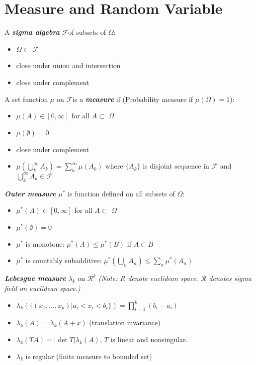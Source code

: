 \documentclass[10pt,twocolumn]{article}
\newenvironment{mydef}[1][Definition]{\begin{trivlist}
\item[\hskip \labelsep {\bfseries #1}]}{\end{trivlist}}
\newcommand{\sigmaField} {$\mathscr{F}$}
\newcommand{\samspace} {$\Omega$}
\newcommand{\real}{ \mathscr{R}}
\newcommand{\bt}[1]{\textbf{\textit{#1}}}
\begin{document}
\section*{Measure and Random Variable}
\begin{mydef}
	A \bt{sigma algebra} \sigmaField of subsets of \samspace:
	\begin{itemize}
		\item \samspace $\in$ \sigmaField
		\item close under union and intersection
		\item close under complement
	\end{itemize}
\end{mydef}

\begin{mydef}
	A set function $\mu$ on \sigmaField is a \bt{measure} if (Probability measure if $\mu (\Omega ) = 1$):
	\begin{itemize}
		\item $\mu (A)\in [0, \infty]$ for all $A \subset$ \samspace
		\item $\mu (\emptyset) = 0$
		\item close under complement
		\item $\mu (\bigcup^{\infty}_k A_k) = \sum^{\infty}_k \mu (A_k)$ where $\{A_k\}$ is disjoint sequence in $\mathscr{F}$ and $\bigcup^{\infty}_kA_k \in \mathscr{F}$
	\end{itemize}
\end{mydef}

\begin{mydef}
	\bt{Outer measure} $\mu^*$ is function defined on all subsets of \samspace:
	\begin{itemize}
		\item $\mu^*(A)\in [0, \infty]$ for all $A \subset$ \samspace
		\item $\mu^*(\emptyset) = 0$
		\item $\mu^*$ is monotone: $\mu^*(A) \leq \mu^*(B)$ if $A \subset B$
		\item $\mu^*$ is countably subadditive: $\mu^*(\bigcup_nA_n) \leq \sum_n \mu^*(A_n)$
	\end{itemize}
\end{mydef}

\begin{mydef}
	\bt{Lebesgue measure} $\lambda_k$ on $\real ^k$  \textit{(Note: $R$ denote euclidean space. $\mathscr{R}$ denotes sigma field on euclidean space.)} 
	\begin{itemize}
		\item $\lambda_k(\{(x_1, ..., x_k)| a_i < x_i < b_i\}) = \prod^k_{i=1}(b_i - a_i)$
		\item $\lambda_k(A) = \lambda_k(A+x)$ (translation invariance)
		\item $\lambda_k(TA) = |\det{T}|\lambda_k(A)$, $T$ is linear and nonsingular.
		\item $\lambda_k$ is regular (finite measure to bounded set)
	\end{itemize}
\end{mydef}
\end{document}

